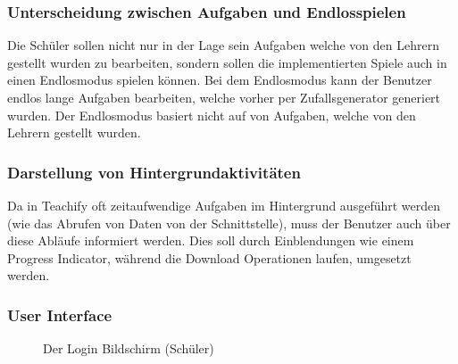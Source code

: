 \subsubsection{Unterscheidung zwischen Aufgaben und Endlosspielen}
Die Schüler sollen nicht nur in der Lage sein Aufgaben welche von den Lehrern gestellt wurden zu bearbeiten, sondern sollen die implementierten Spiele auch in einen Endlosmodus spielen können. Bei dem Endlosmodus kann der Benutzer endlos lange Aufgaben bearbeiten, welche vorher per Zufallsgenerator generiert wurden. Der Endlosmodus basiert nicht auf von Aufgaben, welche von den Lehrern gestellt wurden.

\subsubsection{Darstellung von Hintergrundaktivitäten}
Da in Teachify oft zeitaufwendige Aufgaben im Hintergrund ausgeführt werden (wie das Abrufen von Daten von der Schnittstelle), muss der Benutzer auch über diese Abläufe informiert werden. Dies soll durch Einblendungen wie einem Progress Indicator, während die Download Operationen laufen, umgesetzt werden.


\subsubsection{User Interface}
\begin{figure}[h]
	\centering
	\caption{Der Login Bildschirm (Schüler)}
	\label{Der Login Bildschirm}
\end{figure}

